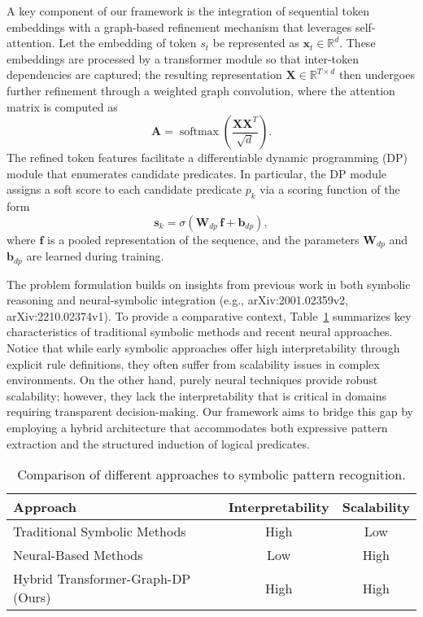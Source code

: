 \documentclass{article}
\begin{document}
A key component of our framework is the integration of sequential token embeddings with a graph-based refinement mechanism that leverages self-attention. Let the embedding of token \(s_t\) be represented as \(\mathbf{x}_t \in \mathbb{R}^d\). These embeddings are processed by a transformer module so that inter-token dependencies are captured; the resulting representation \(\mathbf{X} \in \mathbb{R}^{T \times d}\) then undergoes further refinement through a weighted graph convolution, where the attention matrix is computed as
\[
\mathbf{A} = \operatorname{softmax}\!\left(\frac{\mathbf{X}\mathbf{X}^T}{\sqrt{d}}\right).
\]
The refined token features facilitate a differentiable dynamic programming (DP) module that enumerates candidate predicates. In particular, the DP module assigns a soft score to each candidate predicate \(p_k\) via a scoring function of the form
\[
\mathbf{s}_k = \sigma\!\left(\mathbf{W}_{dp}\, \mathbf{f} + \mathbf{b}_{dp}\right),
\]
where \(\mathbf{f}\) is a pooled representation of the sequence, and the parameters \(\mathbf{W}_{dp}\) and \(\mathbf{b}_{dp}\) are learned during training.

The problem formulation builds on insights from previous work in both symbolic reasoning and neural-symbolic integration (e.g., arXiv:2001.02359v2, arXiv:2210.02374v1). To provide a comparative context, Table~\ref{tab:background} summarizes key characteristics of traditional symbolic methods and recent neural approaches. Notice that while early symbolic approaches offer high interpretability through explicit rule definitions, they often suffer from scalability issues in complex environments. On the other hand, purely neural techniques provide robust scalability; however, they lack the interpretability that is critical in domains requiring transparent decision-making. Our framework aims to bridge this gap by employing a hybrid architecture that accommodates both expressive pattern extraction and the structured induction of logical predicates.

\begin{table}[H]
\centering
\begin{tabular}{lcc}
\hline
Approach & Interpretability & Scalability \\
\hline
Traditional Symbolic Methods & High & Low \\
Neural-Based Methods & Low & High \\
Hybrid Transformer-Graph-DP (Ours) & High & High \\
\hline
\end{tabular}
\caption{Comparison of different approaches to symbolic pattern recognition.}
\label{tab:background}
\end{table}
\end{document}
